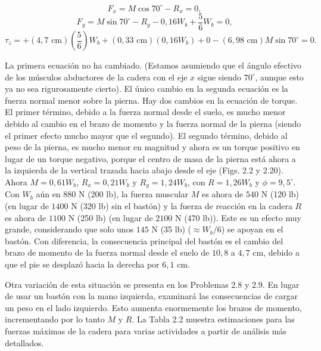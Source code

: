 \documentclass[12pt]{book}
\begin{document}
\begin{equation}
F_x = M \cos 70^\circ - R_x = 0,
\label{eq:2.31}
\end{equation}
\begin{equation}
F_y = M \sin 70^\circ - R_y - 0,16 W_b + \frac{5}{6}W_b = 0,
\label{eq:2.32}
\end{equation}
\begin{equation}
\tau_z = +(4,7\text{ cm})\left(\frac{5}{6}\right)W_b + (0,33\text{ cm})(0,16 W_b) + 0 - (6,98\text{ cm})M \sin 70^\circ = 0.
\label{eq:2.33}
\end{equation}

La primera ecuación no ha cambiado. (Estamos asumiendo que el ángulo efectivo de los músculos abductores de la cadera con el eje $x$ sigue siendo $70^\circ$, aunque esto ya no sea rigurosamente cierto). El único cambio en la segunda ecuación es la fuerza normal menor sobre la pierna. Hay dos cambios en la ecuación de torque. El primer término, debido a la fuerza normal desde el suelo, es mucho menor debido al cambio en el brazo de momento y la fuerza normal de la pierna (siendo el primer efecto mucho mayor que el segundo). El segundo término, debido al peso de la pierna, es mucho menor en magnitud y ahora es un torque positivo en lugar de un torque negativo, porque el centro de masa de la pierna está ahora a la izquierda de la vertical trazada hacia abajo desde el eje (Figs. 2.2 y 2.20). Ahora $M = 0,61 W_b$, $R_x = 0,21 W_b$ y $R_y = 1,24 W_b$, con $R = 1,26 W_b$ y $\phi = 9,5^\circ$. Con $W_b$ aún en $880\text{ N}$ (200 lb), la fuerza muscular $M$ es ahora de $540\text{ N}$ (120 lb) (en lugar de $1400\text{ N}$ (320 lb) sin el bastón) y la fuerza de reacción en la cadera $R$ es ahora de $1100\text{ N}$ (250 lb) (en lugar de $2100\text{ N}$ (470 lb)). Este es un efecto muy grande, considerando que solo unos $145\text{ N}$ (35 lb) ($\approx W_b/6$) se apoyan en el bastón. Con diferencia, la consecuencia principal del bastón es el cambio del brazo de momento de la fuerza normal desde el suelo de $10,8$ a $4,7\text{ cm}$, debido a que el pie se desplazó hacia la derecha por $6,1\text{ cm}$.

Otra variación de esta situación se presenta en los Problemas 2.8 y 2.9. En lugar de usar un bastón con la mano izquierda, examinará las consecuencias de cargar un peso en el lado izquierdo. Esto aumenta enormemente los brazos de momento, incrementando por lo tanto $M$ y $R$. La Tabla 2.2 muestra estimaciones para las fuerzas máximas de la cadera para varias actividades a partir de análisis más detallados.
\end{document}
